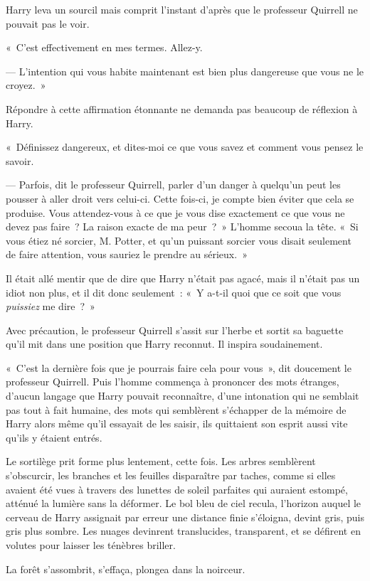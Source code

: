 Harry leva un sourcil mais comprit l'instant d'après que le professeur Quirrell ne pouvait pas le voir.

«~C'est effectivement en mes termes. Allez-y.

--- L'intention qui vous habite maintenant est bien plus dangereuse que vous ne le croyez.~»

Répondre à cette affirmation étonnante ne demanda pas beaucoup de réflexion à Harry.

«~Définissez dangereux, et dites-moi ce que vous savez et comment vous pensez le savoir.

--- Parfois, dit le professeur Quirrell, parler d'un danger à quelqu'un peut les pousser à aller droit vers celui-ci. Cette fois-ci, je compte bien éviter que cela se produise. Vous attendez-vous à ce que je vous dise exactement ce que vous ne devez pas faire~? La raison exacte de ma peur~?~» L'homme secoua la tête. «~Si vous étiez né sorcier, M. Potter, et qu'un puissant sorcier vous disait seulement de faire attention, vous sauriez le prendre au sérieux.~»

Il était allé mentir que de dire que Harry n'était pas agacé, mais il n'était pas un idiot non plus, et il dit donc seulement~: «~Y a-t-il quoi que ce soit que vous \emph{puissiez} me dire~?~»

Avec précaution, le professeur Quirrell s'assit sur l'herbe et sortit sa baguette qu'il mit dans une position que Harry reconnut. Il inspira soudainement.

«~C'est la dernière fois que je pourrais faire cela pour vous~», dit doucement le professeur Quirrell. Puis l'homme commença à prononcer des mots étranges, d'aucun langage que Harry pouvait reconnaître, d'une intonation qui ne semblait pas tout à fait humaine, des mots qui semblèrent s'échapper de la mémoire de Harry alors même qu'il essayait de les saisir, ils quittaient son esprit aussi vite qu'ils y étaient entrés.

Le sortilège prit forme plus lentement, cette fois. Les arbres semblèrent s'obscurcir, les branches et les feuilles disparaître par taches, comme si elles avaient été vues à travers des lunettes de soleil parfaites qui auraient estompé, atténué la lumière sans la déformer. Le bol bleu de ciel recula, l'horizon auquel le cerveau de Harry assignait par erreur une distance finie s'éloigna, devint gris, puis gris plus sombre. Les nuages devinrent translucides, transparent, et se défirent en volutes pour laisser les ténèbres briller.

La forêt s'assombrit, s'effaça, plongea dans la noirceur.

